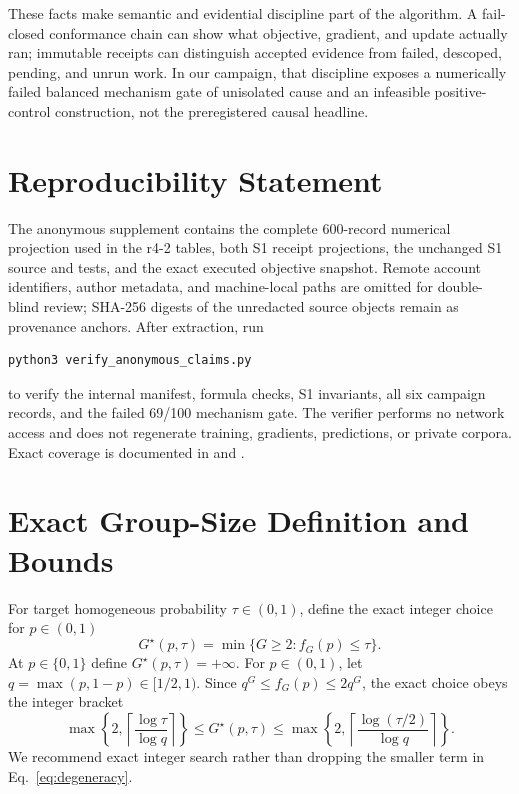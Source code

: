 \documentclass{article}
\begin{document}
These facts make semantic and evidential discipline part of the algorithm.  A
fail-closed conformance chain can show what objective, gradient, and update
actually ran; immutable receipts can distinguish accepted evidence from failed,
descoped, pending, and unrun work.  In our campaign, that discipline exposes a
numerically failed balanced mechanism gate of unisolated cause and an
infeasible positive-control construction, not the preregistered causal
headline.

\section*{Reproducibility Statement}

The anonymous supplement contains the complete 600-record numerical projection
used in the r4-2 tables, both S1 receipt projections, the unchanged S1 source and
tests, and the exact executed objective snapshot.  Remote account identifiers,
author metadata, and machine-local paths are omitted for double-blind review;
SHA-256 digests of the unredacted source objects remain as provenance anchors.
After extraction, run
\begin{verbatim}
python3 verify_anonymous_claims.py
\end{verbatim}
to verify the internal manifest, formula checks, S1 invariants, all six campaign
records, and the failed 69/100 mechanism gate.  The verifier performs no network
access and does not regenerate training, gradients, predictions, or private
corpora.  Exact coverage is documented in
 and
.




\appendix

\section{Exact Group-Size Definition and Bounds}

For target homogeneous probability $\tau\in(0,1)$, define the exact integer
choice for $p\in(0,1)$
\begin{equation}
 G^\star(p,\tau)=\min\{G\geq2:f_G(p)\leq\tau\}.
\end{equation}
At $p\in\{0,1\}$ define $G^\star(p,\tau)=+\infty$.  For $p\in(0,1)$, let
$q=\max(p,1-p)\in[1/2,1)$.  Since
$q^G\leq f_G(p)\leq2q^G$, the exact choice obeys the integer bracket
\begin{equation}
 \max\!\left\{2,\left\lceil\frac{\log\tau}{\log q}\right\rceil\right\}
 \leq G^\star(p,\tau) \leq
 \max\!\left\{2,\left\lceil\frac{\log(\tau/2)}{\log q}\right\rceil\right\}.
\end{equation}
We recommend exact integer search rather than dropping the smaller term in
Eq.~\eqref{eq:degeneracy}.
\end{document}
